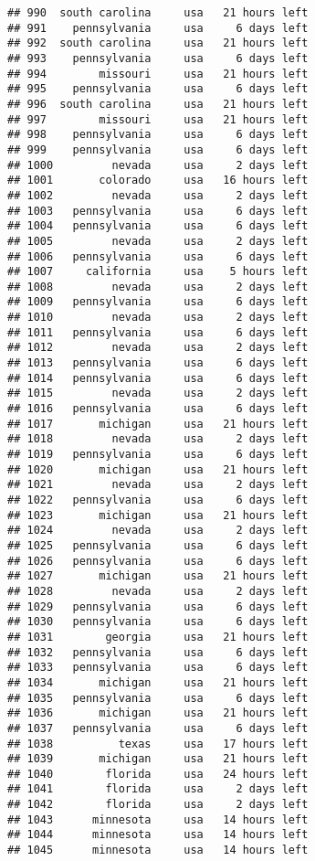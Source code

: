 \documentclass[
]{article}
\begin{document}
\begin{verbatim}
## 990  south carolina     usa   21 hours left
## 991    pennsylvania     usa     6 days left
## 992  south carolina     usa   21 hours left
## 993    pennsylvania     usa     6 days left
## 994        missouri     usa   21 hours left
## 995    pennsylvania     usa     6 days left
## 996  south carolina     usa   21 hours left
## 997        missouri     usa   21 hours left
## 998    pennsylvania     usa     6 days left
## 999    pennsylvania     usa     6 days left
## 1000         nevada     usa     2 days left
## 1001       colorado     usa   16 hours left
## 1002         nevada     usa     2 days left
## 1003   pennsylvania     usa     6 days left
## 1004   pennsylvania     usa     6 days left
## 1005         nevada     usa     2 days left
## 1006   pennsylvania     usa     6 days left
## 1007     california     usa    5 hours left
## 1008         nevada     usa     2 days left
## 1009   pennsylvania     usa     6 days left
## 1010         nevada     usa     2 days left
## 1011   pennsylvania     usa     6 days left
## 1012         nevada     usa     2 days left
## 1013   pennsylvania     usa     6 days left
## 1014   pennsylvania     usa     6 days left
## 1015         nevada     usa     2 days left
## 1016   pennsylvania     usa     6 days left
## 1017       michigan     usa   21 hours left
## 1018         nevada     usa     2 days left
## 1019   pennsylvania     usa     6 days left
## 1020       michigan     usa   21 hours left
## 1021         nevada     usa     2 days left
## 1022   pennsylvania     usa     6 days left
## 1023       michigan     usa   21 hours left
## 1024         nevada     usa     2 days left
## 1025   pennsylvania     usa     6 days left
## 1026   pennsylvania     usa     6 days left
## 1027       michigan     usa   21 hours left
## 1028         nevada     usa     2 days left
## 1029   pennsylvania     usa     6 days left
## 1030   pennsylvania     usa     6 days left
## 1031        georgia     usa   21 hours left
## 1032   pennsylvania     usa     6 days left
## 1033   pennsylvania     usa     6 days left
## 1034       michigan     usa   21 hours left
## 1035   pennsylvania     usa     6 days left
## 1036       michigan     usa   21 hours left
## 1037   pennsylvania     usa     6 days left
## 1038          texas     usa   17 hours left
## 1039       michigan     usa   21 hours left
## 1040        florida     usa   24 hours left
## 1041        florida     usa     2 days left
## 1042        florida     usa     2 days left
## 1043      minnesota     usa   14 hours left
## 1044      minnesota     usa   14 hours left
## 1045      minnesota     usa   14 hours left

\end{verbatim}
\end{document}
